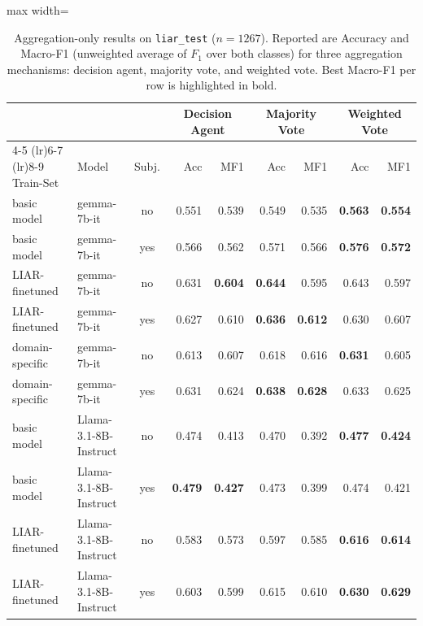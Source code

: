 \begin{table}[t]
\centering
\scriptsize
\setlength{\tabcolsep}{3.5pt}
\renewcommand{\arraystretch}{1.05}
\caption{Aggregation-only results on \texttt{liar\_test} ($n = 1267$). Reported are Accuracy and Macro-F1 (unweighted average of $F_1$ over both classes) for three aggregation mechanisms: decision agent, majority vote, and weighted vote. Best Macro-F1 per row is highlighted in bold.}
\label{tab:multiagent_agg_subset}
\begin{adjustbox}{max width=\textwidth}
\begin{tabular}{@{}l p{2.8cm} c rr rr rr@{}}
\toprule
& & & \multicolumn{2}{c}{Decision Agent} & \multicolumn{2}{c}{Majority Vote} & \multicolumn{2}{c}{Weighted Vote} \\
\cmidrule(lr){4-5} \cmidrule(lr){6-7} \cmidrule(lr){8-9}
Train-Set & Model & Subj. & Acc & MF1 & Acc & MF1 & Acc & MF1 \\
\midrule
basic model     & gemma-7b-it           & no  & 0.551 & 0.539          & 0.549 & 0.535          & \textbf{0.563} & \textbf{0.554} \\
basic model     & gemma-7b-it           & yes & 0.566 & 0.562          & 0.571 & 0.566          & \textbf{0.576} & \textbf{0.572} \\
LIAR-finetuned  & gemma-7b-it           & no  & 0.631 & \textbf{0.604} & \textbf{0.644} & 0.595          & 0.643 & 0.597 \\
LIAR-finetuned  & gemma-7b-it           & yes & 0.627 & 0.610          & \textbf{0.636} & \textbf{0.612} & 0.630 & 0.607 \\
domain-specific & gemma-7b-it           & no  & 0.613 & 0.607          & 0.618 & 0.616          & \textbf{0.631} & 0.605 \\
domain-specific & gemma-7b-it           & yes & 0.631 & 0.624          & \textbf{0.638} & \textbf{0.628} & 0.633 & 0.625 \\
\midrule
basic model     & Llama-3.1-8B-Instruct & no  & 0.474 & 0.413          & 0.470 & 0.392          & \textbf{0.477} & \textbf{0.424} \\
basic model     & Llama-3.1-8B-Instruct & yes & \textbf{0.479} & \textbf{0.427} & 0.473 & 0.399        & 0.474 & 0.421 \\
LIAR-finetuned  & Llama-3.1-8B-Instruct & no  & 0.583 & 0.573          & 0.597 & 0.585          & \textbf{0.616} & \textbf{0.614} \\
LIAR-finetuned  & Llama-3.1-8B-Instruct & yes & 0.603 & 0.599          & 0.615 & 0.610          & \textbf{0.630} & \textbf{0.629} \\

\end{tabular}
\end{adjustbox}
\end{table}
